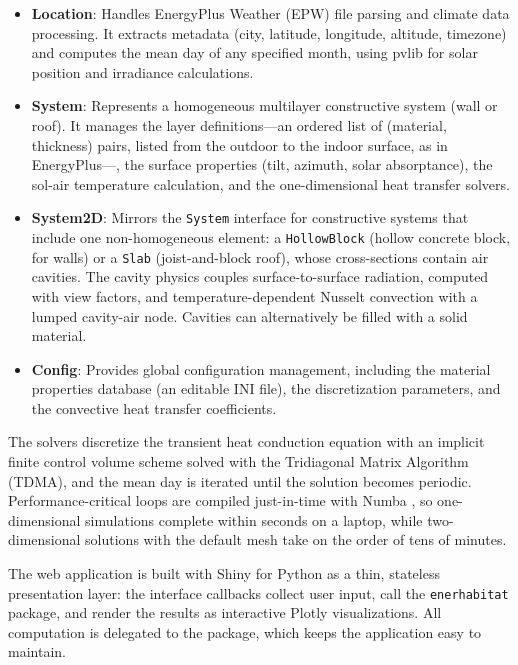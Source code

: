 \documentclass[preprint,12pt, a4paper]{elsarticle}
\begin{document}
\begin{itemize}
    \item \textbf{Location}: Handles EnergyPlus Weather (EPW) file parsing and climate data processing. It extracts metadata (city, latitude, longitude, altitude, timezone) and computes the mean day of any specified month, using pvlib \cite{anderson2023pvlib} for solar position and irradiance calculations.

    \item \textbf{System}: Represents a homogeneous multilayer constructive system (wall or roof). It manages the layer definitions---an ordered list of (material, thickness) pairs, listed from the outdoor to the indoor surface, as in EnergyPlus---, the surface properties (tilt, azimuth, solar absorptance), the sol-air temperature calculation, and the one-dimensional heat transfer solvers.

    \item \textbf{System2D}: Mirrors the \texttt{System} interface for constructive systems that include one non-homogeneous element: a \texttt{HollowBlock} (hollow concrete block, for walls) or a \texttt{Slab} (joist-and-block roof), whose cross-sections contain air cavities. The cavity physics couples surface-to-surface radiation, computed with view factors, and temperature-dependent Nusselt convection with a lumped cavity-air node. Cavities can alternatively be filled with a solid material.

    \item \textbf{Config}: Provides global configuration management, including the material properties database (an editable INI file), the discretization parameters, and the convective heat transfer coefficients.
\end{itemize}

The solvers discretize the transient heat conduction equation with an implicit finite control volume scheme \cite{patankar1980numerical} solved with the Tridiagonal Matrix Algorithm (TDMA), and the mean day is iterated until the solution becomes periodic. Performance-critical loops are compiled just-in-time with Numba \cite{lam2015numba}, so one-dimensional simulations complete within seconds on a laptop, while two-dimensional solutions with the default mesh take on the order of tens of minutes.

The web application is built with Shiny for Python \cite{shiny2024python} as a thin, stateless presentation layer: the interface callbacks collect user input, call the \texttt{enerhabitat} package, and render the results as interactive Plotly \cite{plotly2024python} visualizations. All computation is delegated to the package, which keeps the application easy to maintain.
\end{document}
